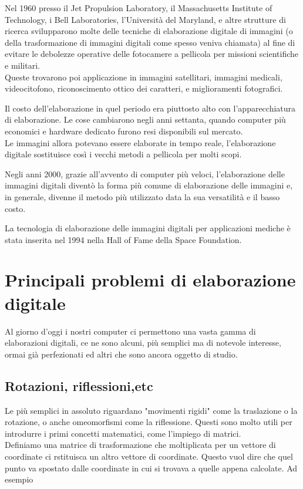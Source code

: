 \vspace{1em} \noindent
Nel 1960 presso il Jet Propulsion Laboratory, il Massachusetts Institute of Technology, i Bell Laboratories, l'Università del Maryland, e altre strutture di ricerca svilupparono molte delle tecniche di elaborazione digitale di immagini (o della trasformazione di immagini digitali come spesso veniva chiamata) al fine di evitare le debolezze operative delle fotocamere a pellicola per missioni scientifiche e militari.\\
Queste trovarono poi applicazione in immagini satellitari, immagini medicali, videocitofono, riconoscimento ottico dei caratteri, e miglioramenti fotografici.

Il costo dell'elaborazione in quel periodo era piuttosto alto con l'apparecchiatura di elaborazione. Le cose cambiarono negli anni settanta, quando computer più economici e hardware dedicato furono resi disponibili sul mercato.\\
Le immagini allora potevano essere elaborate in tempo reale, l'elaborazione digitale sostituisce così i vecchi metodi a pellicola per molti scopi.

\vspace{1em} \noindent
Negli anni 2000, grazie all'avvento di computer più veloci, l'elaborazione delle immagini digitali diventò la forma più comune di elaborazione delle immagini e, in generale, divenne il metodo più utilizzato data la sua versatilità e il basso costo.

La tecnologia di elaborazione delle immagini digitali per applicazioni mediche è stata inserita nel 1994 nella Hall of Fame della Space Foundation.


\section{Principali problemi di elaborazione digitale}

Al giorno d'oggi i nostri computer ci permettono una vasta gamma di elaborazioni digitali, ce ne sono alcuni, più semplici ma di notevole interesse, ormai già perfezionati ed altri che sono ancora oggetto di studio.

\subsection{Rotazioni, riflessioni,etc}
Le più semplici in assoluto riguardano "movimenti rigidi" come la traslazione o la rotazione, o anche omeomorfismi come la riflessione. Questi sono molto utili per introdurre i primi concetti matematici, come l'impiego di matrici.\\
Definiamo una matrice di trasformazione che moltiplicata per un vettore di coordinate ci rstituisca un altro vettore di coordinate. Questo vuol dire che quel punto va spostato dalle coordinate in cui si trovava a quelle appena calcolate. Ad esempio  

